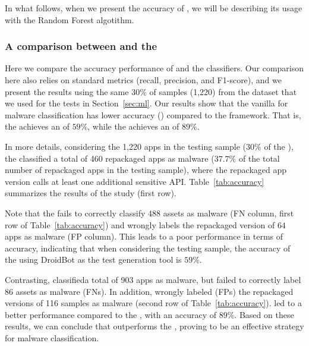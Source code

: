 In what follows, when we present the accuracy of \droidxpflow, we
will be describing its usage with the Random Forest algotithm.



\subsubsection{A comparison between \droidxpflow and the \mas}

Here we compare the accuracy performance of \droidxpflow and the \mas classifiers.
Our comparison here also relies on standard metrics
(recall, precision, and F1-score), and we present the results using the
same $30\%$ of samples (1,220) from the \fds dataset that we used for the tests
in Section~\ref{sec:ml}.
Our results show that the vanilla \mas for malware classification has lower accuracy (\fone) compared to the \droidxpflow framework.
That is, the \mas achieves an \fone of $59\%$, while the \droidxpflow achieves an \fone of $89\%$.


In more details, considering the 1,220 apps in the testing sample ($30\%$ of the \fds),
the \mas classified a total of 460 repackaged apps as malware ($37.7\%$ of the total number of repackaged apps in the
testing sample), where the repackaged app version calls at least one additional sensitive API.
Table~\ref{tab:accuracy} summarizes the results of the study (first row).

Note that the \mas fails to correctly classify 488 assets as malware (FN column, first row of Table~\ref{tab:accuracy})
and wrongly labels the repackaged version of $64$ apps as malware (FP column). This
leads to a poor performance in terms of accuracy, indicating that when considering the \fds testing sample,
the accuracy of the \mas using DroidBot as the test generation tool is $59\%$.

Contrasting, \droidxpflow classifieda total of 903 apps as malware, but failed to correctly label 86 assets as malware (FNs).
In addition, \droidxpflow wrongly labeled (FPs) the repackaged versions of 116 samples as malware
(second row of Table~\ref{tab:accuracy}). \droidxpflow led to a better performance compared to the \mas,
with an accuracy of $89\%$. Based on these results, we can conclude that \droidxpflow outperforms the \mas, proving to be an effective
strategy for malware classification. 

